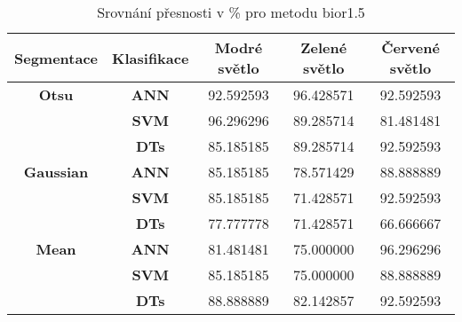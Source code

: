 \capstartfalse
\begin{table}[!htbp]
\centering
\begin{tabular}{|c|c|c|c|c|}
\hline
\textbf{Segmentace} & \textbf{Klasifikace} & \textbf{Modré světlo} & \textbf{Zelené světlo} & \textbf{Červené světlo} \\ \hline
\textbf{Otsu}       & \textbf{ANN}         & 92.592593             & 96.428571              & 92.592593               \\ \hline
\textbf{}           & \textbf{SVM}         & 96.296296             & 89.285714              & 81.481481               \\ \hline
\textbf{}           & \textbf{DTs}         & 85.185185             & 89.285714              & 92.592593               \\ \hline
\textbf{Gaussian}   & \textbf{ANN}         & 85.185185             & 78.571429              & 88.888889               \\ \hline
\textbf{}           & \textbf{SVM}         & 85.185185             & 71.428571              & 92.592593               \\ \hline
\textbf{}           & \textbf{DTs}         & 77.777778             & 71.428571              & 66.666667               \\ \hline
\textbf{Mean}       & \textbf{ANN}         & 81.481481             & 75.000000              & 96.296296               \\ \hline
\textbf{}           & \textbf{SVM}         & 85.185185             & 75.000000              & 88.888889               \\ \hline
\textbf{}           & \textbf{DTs}         & 88.888889             & 82.142857              & 92.592593               \\ \hline
\end{tabular}
\caption{Srovnání přesnosti v \% pro metodu bior1.5 }
\end{table}
\capstarttrue

